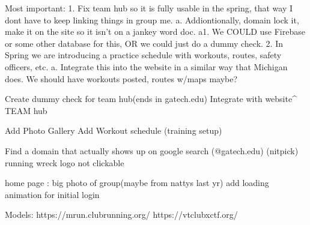 Most important:
    1. Fix team hub so it is fully usable in the spring, that way I dont have to keep linking things in group me.
        a. Addiontionally, domain lock it, make it on the site so it isn't on a jankey word doc. 
            a1. We COULD use Firebase or some other database for this, OR we could just do a dummy check.
    2. In Spring we are introducing a practice schedule with workouts, routes, safety officers, etc. 
        a. Integrate this into the website in a similar way that Michigan does. We should have workouts posted, routes w/maps maybe?
    


Create dummy check for team hub(ends in gatech.edu)
    Integrate with website^ TEAM hub

Add Photo Gallery
Add Workout schedule (training setup)

Find a domain that actually shows up on google search (@gatech.edu)
(nitpick) running wreck logo not clickable

home page :
    big photo of group(maybe from nattys last yr)
    add loading animation for initial login


Models: https://mrun.clubrunning.org/
        https://vtclubxctf.org/